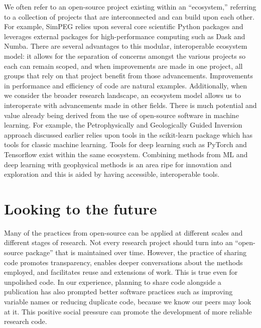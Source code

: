 We often refer to an open-source project existing within an ``ecosystem,'' referring to a collection of projects that are interconnected and can build upon each other. For example, SimPEG relies upon several core scientific Python packages and leverages external packages for high-performance computing such as Dask and Numba. There are several advantages to this modular, interoperable ecosystem model: it allows for the separation of concerns amongst the various projects so each can remain scoped, and when improvements are made in one project, all groups that rely on that project benefit from those advancements. Improvements in performance and efficiency of code are natural examples. Additionally, when we consider the broader research landscape, an ecosystem model allows us to interoperate with advancements made in other fields. There is much potential and value already being derived from the use of open-source software in machine learning. For example, the Petrophysically and Geologically Guided Inversion approach discussed earlier relies upon tools in the scikit-learn package \cite{Pedregosa2011} which has tools for classic machine learning. Tools for deep learning such as PyTorch and Tensorflow exist within the same ecosystem. Combining methods from ML and deep learning with geophysical methods is an area ripe for innovation and exploration and this is aided by having accessible, interoperable tools.

\section{Looking to the future}

Many of the practices from open-source can be applied at different scales and different stages of research. Not every research project should turn into an ``open-source package'' that is maintained over time. However, the practice of sharing code promotes transparency, enables deeper conversations about the methods employed, and facilitates reuse and extensions of work. This is true even for unpolished code. In our experience, planning to share code alongside a publication has also prompted better software practices such as improving variable names or reducing duplicate code, because we know our peers may look at it. This positive social pressure can promote the development of more reliable research code.

